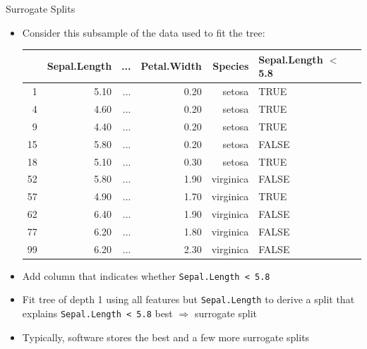 \documentclass[11pt,compress,t,notes=noshow, xcolor=table]{beamer}
\begin{document}
\begin{vbframe}{Surrogate Splits}
\begin{itemize}
\item Consider this subsample of the data used to fit the tree:
\begin{table}[ht]
\tiny
\centering
\begin{tabular}{rrrrrll}
  \hline
 & Sepal.Length & ... & Petal.Width & Species & Sepal.Length $<$ 5.8 \\ 
  \hline
1 & 5.10 & ... & 0.20 & setosa & TRUE \\ 
  4 & 4.60 & ... & 0.20 & setosa & TRUE \\ 
  9 & 4.40 & ... & 0.20 & setosa & TRUE \\ 
  15 & 5.80 & ... & 0.20 & setosa & FALSE \\ 
  18 & 5.10 & ... & 0.30 & setosa & TRUE \\ 
  52 & 5.80 & ... & 1.90 & virginica & FALSE \\ 
  57 & 4.90 & ... & 1.70 & virginica & TRUE \\ 
  62 & 6.40 & ... & 1.90 & virginica & FALSE \\ 
  77 & 6.20 & ... & 1.80 & virginica & FALSE \\ 
  99 & 6.20 & ... & 2.30 & virginica & FALSE \\ 
   \hline
\end{tabular}
\end{table}
\item Add column that indicates whether \texttt{Sepal.Length < 5.8}
\item Fit tree of depth 1 using all features but \texttt{Sepal.Length} %
to derive a split that explains 
\texttt{Sepal.Length < 5.8} best $\Rightarrow$ surrogate split
\item Typically, software stores the best and a few more surrogate splits

\end{itemize}


\end{vbframe}


\endlecture
\end{document}
